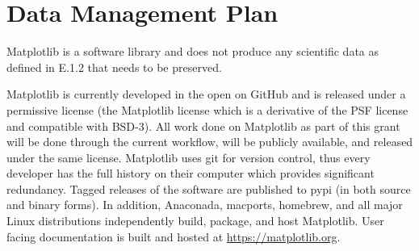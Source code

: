 \documentclass[12pt]{article}
\numberwithin{page}{section}
\begin{document}
\def\sovast{\ref@jnl{Soviet~Ast.}}      %
\def\ssr{\ref@jnl{Space~Sci.~Rev.}}     %
\def\zap{\ref@jnl{ZAp}}                 %
\def\nat{\ref@jnl{Nature}}              %
\def\iaucirc{\ref@jnl{IAU~Circ.}}       %
\def\aplett{\ref@jnl{Astrophys.~Lett.}} %
\def\apspr{\ref@jnl{Astrophys.~Space~Phys.~Res.}}
\def\bain{\ref@jnl{Bull.~Astron.~Inst.~Netherlands}}
\def\fcp{\ref@jnl{Fund.~Cosmic~Phys.}}  %
\def\gca{\ref@jnl{Geochim.~Cosmochim.~Acta}}   %
\def\grl{\ref@jnl{Geophys.~Res.~Lett.}} %
\def\jcp{\ref@jnl{J.~Chem.~Phys.}}      %
\def\jgr{\ref@jnl{J.~Geophys.~Res.}}    %
\def\jqsrt{\ref@jnl{J.~Quant.~Spec.~Radiat.~Transf.}}
\def\memsai{\ref@jnl{Mem.~Soc.~Astron.~Italiana}}
\def\nphysa{\ref@jnl{Nucl.~Phys.~A}}   %
\def\physrep{\ref@jnl{Phys.~Rep.}}   %
\def\physscr{\ref@jnl{Phys.~Scr}}   %
\def\planss{\ref@jnl{Planet.~Space~Sci.}}   %
\def\procspie{\ref@jnl{Proc.~SPIE}}   %

\let\astap=\aap
\let\apjlett=\apjl
\let\apjsupp=\apjs
\let\applopt=\ao
\setcounter{page}{1}


\newpage
\section{Data Management Plan}
\setcounter{page}{1}

Matplotlib is a software library and does not produce any scientific
data as defined in E.1.2 that needs to be preserved.

Matplotlib is currently developed in the open on GitHub and is
released under a permissive license (the Matplotlib license which is a
derivative of the PSF license and compatible with BSD-3).  All work
done on Matplotlib as part of this grant will be done through the
current workflow, will be publicly available, and released under the
same license.  Matplotlib uses git for version control, thus every
developer has the full history on their computer which provides
significant redundancy.  Tagged releases of the software are published
to pypi (in both source and binary forms).  In addition, Anaconada,
macports, homebrew, and all major Linux distributions independently
build, package, and host Matplotlib.  User facing documentation is built
and hosted at \url{https://matplotlib.org}.
\end{document}
